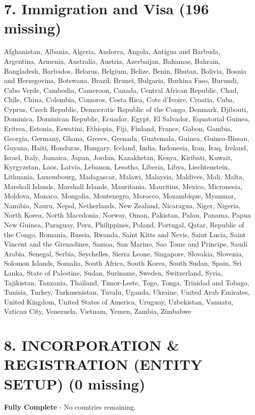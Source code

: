 \documentclass{article}
\begin{document}
\section*{7. Immigration and Visa (196 missing)}
Afghanistan, Albania, Algeria, Andorra, Angola, Antigua and Barbuda, Argentina, Armenia, Australia, Austria, Azerbaijan, Bahamas, Bahrain, Bangladesh, Barbados, Belarus, Belgium, Belize, Benin, Bhutan, Bolivia, Bosnia and Herzegovina, Botswana, Brazil, Brunei, Bulgaria, Burkina Faso, Burundi, Cabo Verde, Cambodia, Cameroon, Canada, Central African Republic, Chad, Chile, China, Colombia, Comoros, Costa Rica, Cote d'Ivoire, Croatia, Cuba, Cyprus, Czech Republic, Democratic Republic of the Congo, Denmark, Djibouti, Dominica, Dominican Republic, Ecuador, Egypt, El Salvador, Equatorial Guinea, Eritrea, Estonia, Eswatini, Ethiopia, Fiji, Finland, France, Gabon, Gambia, Georgia, Germany, Ghana, Greece, Grenada, Guatemala, Guinea, Guinea-Bissau, Guyana, Haiti, Honduras, Hungary, Iceland, India, Indonesia, Iran, Iraq, Ireland, Israel, Italy, Jamaica, Japan, Jordan, Kazakhstan, Kenya, Kiribati, Kuwait, Kyrgyzstan, Laos, Latvia, Lebanon, Lesotho, Liberia, Libya, Liechtenstein, Lithuania, Luxembourg, Madagascar, Malawi, Malaysia, Maldives, Mali, Malta, Marshall Islands, Marshall Islands, Mauritania, Mauritius, Mexico, Micronesia, Moldova, Monaco, Mongolia, Montenegro, Morocco, Mozambique, Myanmar, Namibia, Nauru, Nepal, Netherlands, New Zealand, Nicaragua, Niger, Nigeria, North Korea, North Macedonia, Norway, Oman, Pakistan, Palau, Panama, Papua New Guinea, Paraguay, Peru, Philippines, Poland, Portugal, Qatar, Republic of the Congo, Romania, Russia, Rwanda, Saint Kitts and Nevis, Saint Lucia, Saint Vincent and the Grenadines, Samoa, San Marino, Sao Tome and Principe, Saudi Arabia, Senegal, Serbia, Seychelles, Sierra Leone, Singapore, Slovakia, Slovenia, Solomon Islands, Somalia, South Africa, South Korea, South Sudan, Spain, Sri Lanka, State of Palestine, Sudan, Suriname, Sweden, Switzerland, Syria, Tajikistan, Tanzania, Thailand, Timor-Leste, Togo, Tonga, Trinidad and Tobago, Tunisia, Turkey, Turkmenistan, Tuvalu, Uganda, Ukraine, United Arab Emirates, United Kingdom, United States of America, Uruguay, Uzbekistan, Vanuatu, Vatican City, Venezuela, Vietnam, Yemen, Zambia, Zimbabwe

\section*{8. INCORPORATION \& REGISTRATION (ENTITY SETUP) (0 missing)}
\noindent \textbf{Fully Complete} - No countries remaining.
\end{document}
